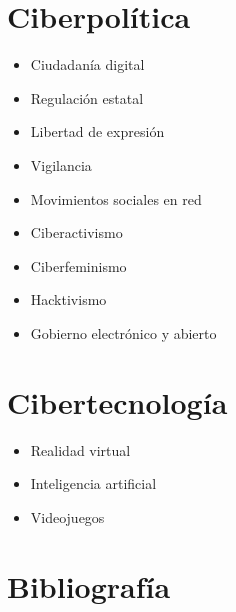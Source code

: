 \documentclass[]{book}
\providecommand{\tightlist}{%
  \setlength{\itemsep}{0pt}\setlength{\parskip}{0pt}}
\begin{document}
\hypertarget{ciberpoluxedtica}{%
\section{Ciberpolítica}\label{ciberpoluxedtica}}

\begin{itemize}
\tightlist
\item
  Ciudadanía digital
\item
  Regulación estatal
\item
  Libertad de expresión
\item
  Vigilancia
\item
  Movimientos sociales en red
\item
  Ciberactivismo
\item
  Ciberfeminismo
\item
  Hacktivismo
\item
  Gobierno electrónico y abierto
\end{itemize}

\hypertarget{cibertecnologuxeda}{%
\section{Cibertecnología}\label{cibertecnologuxeda}}

\begin{itemize}
\tightlist
\item
  Realidad virtual
\item
  Inteligencia artificial
\item
  Videojuegos
\end{itemize}

\hypertarget{bibliografuxeda-2}{%
\section*{Bibliografía}\label{bibliografuxeda-2}}
\end{document}

